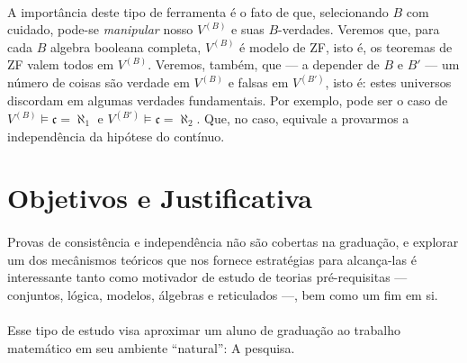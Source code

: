\documentclass[12pt]{article}
\begin{document}
        \paragraph{}
            A importância deste tipo de ferramenta é o fato de que, selecionando $B$ 
            com cuidado, pode-se {\em manipular} nosso $V^{(B)}$ e suas 
            $B$-verdades. Veremos que, para cada $B$ algebra booleana completa, $V^{(B)}$ 
            é modelo de ZF, isto é, os teoremas de ZF valem todos em $V^{(B)}$. Veremos, 
            também, que --- a depender de $B$ e $B'$ --- um número de coisas são verdade em 
            $V^{(B)}$ e falsas em $V^{(B')}$, isto é: estes universos discordam em algumas verdades
            fundamentais. Por exemplo, pode ser o caso de $V^{(B)}\vDash\mathfrak{c}=\aleph_1$ e
            $V^{(B')}\vDash\mathfrak{c}=\aleph_2$. Que, no caso, equivale a provarmos a independência
            da hipótese do contínuo.
    
        \section{Objetivos e Justificativa}
            \paragraph{}
                Provas de consistência e independência não são cobertas na graduação,
                e explorar um dos mecânismos teóricos que nos fornece estratégias para alcança-las
                é interessante tanto como motivador de estudo de teorias pré-requisitas --- 
                conjuntos, lógica, modelos, álgebras e reticulados ---, bem como um fim em si.
            \paragraph{} 
                Esse tipo de estudo visa aproximar um aluno de graduação ao trabalho matemático 
                em seu ambiente ``natural'': A pesquisa.
            
\end{document}
